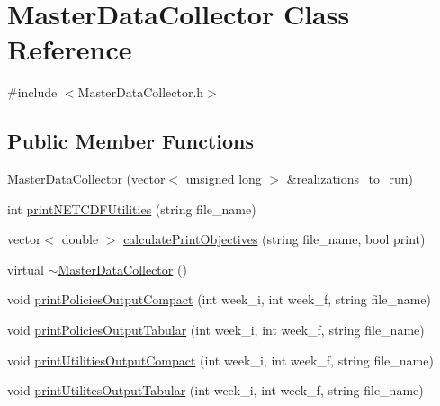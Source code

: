 \hypertarget{classMasterDataCollector}{}\section{Master\+Data\+Collector Class Reference}
\label{classMasterDataCollector}


{\ttfamily \#include $<$Master\+Data\+Collector.\+h$>$}

\subsection*{Public Member Functions}
\begin{DoxyCompactItemize}
\item 
\mbox{\hyperlink{classMasterDataCollector_acb6f64c053bda26e5cf7e4ec8dacd0cd_acb6f64c053bda26e5cf7e4ec8dacd0cd}{Master\+Data\+Collector}} (vector$<$ unsigned long $>$ \&realizations\+\_\+to\+\_\+run)
\item 
int \mbox{\hyperlink{classMasterDataCollector_afabd59af08d3ee5dec1a6710a1966e8e_afabd59af08d3ee5dec1a6710a1966e8e}{print\+N\+E\+T\+C\+D\+F\+Utilities}} (string file\+\_\+name)
\item 
vector$<$ double $>$ \mbox{\hyperlink{classMasterDataCollector_a30c5c81c8c2ccb475ce2ccbb2ae07608_a30c5c81c8c2ccb475ce2ccbb2ae07608}{calculate\+Print\+Objectives}} (string file\+\_\+name, bool print)
\item 
virtual \mbox{\hyperlink{classMasterDataCollector_aaae6da0368b2050c4576c10298809c14_aaae6da0368b2050c4576c10298809c14}{$\sim$\+Master\+Data\+Collector}} ()
\item 
void \mbox{\hyperlink{classMasterDataCollector_aedd180f1f1648164506a0a59216c113f_aedd180f1f1648164506a0a59216c113f}{print\+Policies\+Output\+Compact}} (int week\+\_\+i, int week\+\_\+f, string file\+\_\+name)
\item 
void \mbox{\hyperlink{classMasterDataCollector_aa4a08525c6757376edba653a17d6ff60_aa4a08525c6757376edba653a17d6ff60}{print\+Policies\+Output\+Tabular}} (int week\+\_\+i, int week\+\_\+f, string file\+\_\+name)
\item 
void \mbox{\hyperlink{classMasterDataCollector_a7effc4567580a12567a46dd3f195dbac_a7effc4567580a12567a46dd3f195dbac}{print\+Utilities\+Output\+Compact}} (int week\+\_\+i, int week\+\_\+f, string file\+\_\+name)
\item 
void \mbox{\hyperlink{classMasterDataCollector_a772bc65951a1170900e89679cc7e0652_a772bc65951a1170900e89679cc7e0652}{print\+Utilites\+Output\+Tabular}} (int week\+\_\+i, int week\+\_\+f, string file\+\_\+name)

\end{DoxyCompactItemize}
